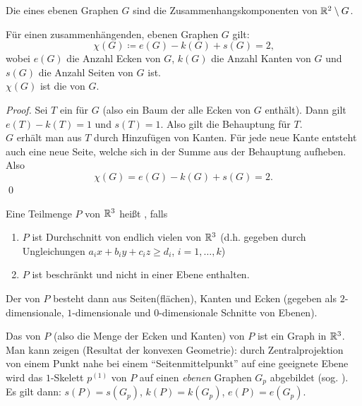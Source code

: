 \begin{definition}[Seiten]
  Die \label{def:seiten} eines ebenen Graphen $ G $ sind die Zusammenhangskomponenten von $ \mathbb{R}^2 \setminus G $.
\end{definition}

\begin{theorem}
  Für einen zusammenhängenden, ebenen Graphen $ G $ gilt:
  \begin{equation*}
    \chi(G) \coloneqq e(G) - k(G) + s(G) = 2\text{,}
  \end{equation*}
  wobei $ e(G) $ die Anzahl Ecken von $ G $, $ k(G) $ die Anzahl Kanten von $ G $ und $ s(G) $ die Anzahl Seiten von $ G $ ist. \\
  $ \chi(G) $ ist die \label{def:eulercharakteristik} von $ G $.
  \begin{proof}
    Sei $ T $ ein \label{def:aufspannenderBaum} für $ G $ (also ein Baum der alle Ecken von $ G $ enthält). Dann gilt $ e(T)-k(T) = 1 $ und $ s(T) = 1 $. Also gilt die Behauptung für $ T $. \\
    $ G $ erhält man aus $ T $ durch Hinzufügen von Kanten. Für jede neue Kante entsteht auch eine neue Seite, welche sich in der Summe aus der Behauptung aufheben. Also
    \begin{equation*}
      \chi(G) = e(G)-k(G)+s(G) = 2\text{.}
    \end{equation*}\qed
  \end{proof}
\end{theorem}

\begin{definition}[Polyeder]
  Eine Teilmenge $ P $ von $ \mathbb{R}^3 $ heißt \label{def:polyeder}, falls
  \begin{enumerate}
    \item $ P $ ist Durchschnitt von endlich vielen \label{def:affinerHalbraum} von $ \mathbb{R}^3 $ (d.h. gegeben durch Ungleichungen $ a_ix+b_iy+c_iz \geq d_i $, $ i = 1, \dots, k $)
    \item $ P $ ist beschränkt und nicht in einer Ebene enthalten.
  \end{enumerate}
  Der \label{def:rand} von $ P $ besteht dann aus Seiten(flächen), Kanten und Ecken (gegeben als $ 2 $-dimensionale, $ 1 $-dimensionale und $ 0 $-dimensionale Schnitte von Ebenen).
\end{definition}

\begin{remark}
  Das \label{def:skelett} von $ P $ (also die Menge der Ecken und Kanten) von $ P $ ist ein Graph in $ \mathbb{R}^3 $. \\
  Man kann zeigen (Resultat der konvexen Geometrie): durch Zentralprojektion von einem Punkt nahe bei einem ``Seitenmittelpunkt'' auf eine geeignete Ebene wird das $ 1 $-Skelett $ p^{(1)} $ von $ P $ auf einen \emph{ebenen} Graphen $ G_p $ abgebildet (sog. \label{def:schlegelDiagramm}). Es gilt dann: $ s(P) = s(G_p) $, $ k(P) = k(G_p) $, $ e(P) = e(G_p) $.
\end{remark}

